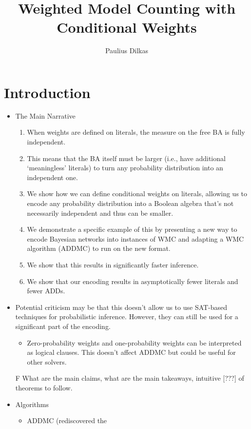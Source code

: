 \documentclass{article}
\title{Weighted Model Counting with Conditional Weights}
\author{Paulius Dilkas}
\theoremstyle{definition}
\theoremstyle{remark}
\begin{document}
\maketitle

\section{Introduction}

\begin{itemize}
\item The Main Narrative
  \begin{enumerate}
  \item When weights are defined on literals, the measure on the free BA is
    fully independent.
  \item This means that the BA itself must be larger (i.e., have additional
    `meaningless' literals) to turn any probability distribution into an
    independent one.
  \item We show how we can define conditional weights on literals, allowing us
    to encode any probability distribution into a Boolean algebra that's not
    necessarily independent and thus can be smaller.
  \item We demonstrate a specific example of this by presenting a new way to
    encode Bayesian networks into instances of WMC and adapting a WMC algorithm
    (ADDMC) to run on the new format.
  \item We show that this results in significantly faster inference.
  \item We show that our encoding results in asymptotically fewer literals and
    fewer ADDs.
  \end{enumerate}
\item Potential criticism may be that this doesn't allow us to use SAT-based
  techniques for probabilistic inference. However, they can still be used for a
  significant part of the encoding.
  \begin{itemize}
  \item Zero-probability weights and one-probability weights can be interpreted
    as logical clauses. This doesn't affect ADDMC but could be useful for other
    solvers.
  \end{itemize}
\item[F] What are the main claims, what are the main takeaways, intuitive [???]
  of theorems to follow.
\item
  Algorithms
  \begin{itemize}
  \item ADDMC \cite{DBLP:conf/aaai/DudekPV20} (rediscovered the

\end{itemize}
\end{itemize}
\end{document}
